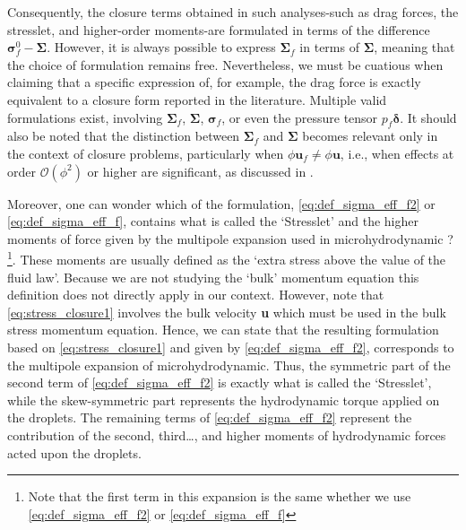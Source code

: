 Consequently, the closure terms obtained in such analyses-such as drag forces, the stresslet, and higher-order moments-are formulated in terms of the difference \(\bm\sigma_f^0 - \bm\Sigma\).
However, it is always possible to express \(\bm\Sigma_f\) in terms of \(\bm\Sigma\), meaning that the choice of formulation remains free. 
Nevertheless, we must be cuatious when claiming that a specific expression of, for example, the drag force is exactly equivalent to a closure form reported in the literature. 
Multiple valid formulations exist, involving \(\bm\Sigma_f\), \(\bm\Sigma\), \(\bm\sigma_f\), or even the pressure tensor \(p_f \bm\delta\).
It should also be noted that the distinction between \(\bm\Sigma_f\) and \(\bm\Sigma\) becomes relevant only in the context of closure problems, particularly when \(\phi \textbf{u}_f \neq \phi \textbf{u}\), i.e., when effects at order \(\mathcal{O}(\phi^2)\) or higher are significant, as discussed in \citet{hinch1977averaged,kim1985modelling}.


Moreover, one can wonder which of the formulation, \ref{eq:def_sigma_eff_f2} or \ref{eq:def_sigma_eff_f}, contains what is called the `Stresslet' and the higher moments of force given by the multipole expansion used in microhydrodynamic ? \citep{pozrikidis1992boundary,kim2013microhydrodynamics}\footnote{Note that the first term in this expansion is the same whether we use \ref{eq:def_sigma_eff_f2} or \ref{eq:def_sigma_eff_f}}.   
These moments are usually defined as the `extra stress above the value of the fluid law'\citep{hinch1977averaged}.
Because we are not studying the `bulk' momentum equation this definition does not directly apply in our context. 
However, note that \ref{eq:stress_closure1} involves the bulk velocity \textbf{u} which must be used in the bulk stress momentum equation.
Hence, we can state that the resulting formulation based on \ref{eq:stress_closure1} and given by \ref{eq:def_sigma_eff_f2}, corresponds to the multipole expansion of microhydrodynamic. 
Thus, the symmetric part of the second term of \ref{eq:def_sigma_eff_f2} is exactly what is called the `Stresslet', while the skew-symmetric part represents the hydrodynamic torque applied on the droplets.
The remaining terms of \ref{eq:def_sigma_eff_f2} represent the contribution of the second, third\ldots, and higher moments of hydrodynamic forces acted upon the droplets.  




